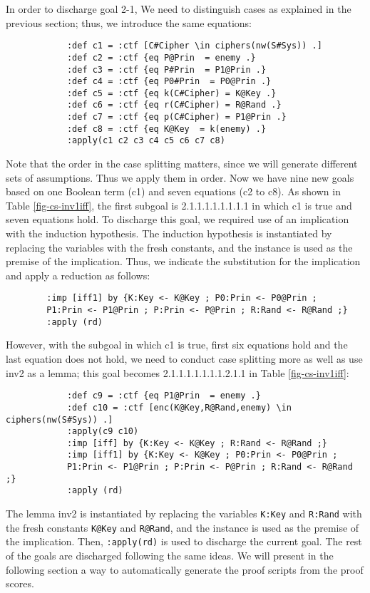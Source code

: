 \documentclass[a4paper,fleqn]{cas-dc}
\begin{document}
In order to discharge goal 2-1, We need to distinguish cases as explained in the previous section; thus, we introduce the same
equations:
	\begin{small}
		\begin{verbatim}
			:def c1 = :ctf [C#Cipher \in ciphers(nw(S#Sys)) .]
			:def c2 = :ctf {eq P@Prin  = enemy .}
			:def c3 = :ctf {eq P#Prin  = P1@Prin .}
			:def c4 = :ctf {eq P0#Prin  = P0@Prin .}
			:def c5 = :ctf {eq k(C#Cipher) = K@Key .}
			:def c6 = :ctf {eq r(C#Cipher) = R@Rand .}
			:def c7 = :ctf {eq p(C#Cipher) = P1@Prin .}
			:def c8 = :ctf {eq K@Key  = k(enemy) .}
			:apply(c1 c2 c3 c4 c5 c6 c7 c8)
		\end{verbatim}
	\end{small}
	\noindent
Note that the order in the case splitting matters, since we will generate different sets of assumptions. Thus we apply them in order. Now we have nine new goals based on one Boolean term (c1) and seven equations (c2 to c8). As shown in Table \ref{fig-cs-inv1iff}, the first subgoal is 2.1.1.1.1.1.1.1.1 in which c1 is true and seven equations hold. To discharge this goal, we required use of an implication with the induction hypothesis. The induction hypothesis is instantiated by	replacing the variables with the fresh constants, and the instance is used as the premise of the implication. Thus, we indicate the substitution for the implication and apply a reduction as follows:
\begin{small}
	\begin{verbatim}
		:imp [iff1] by {K:Key <- K@Key ; P0:Prin <- P0@Prin ;
		P1:Prin <- P1@Prin ; P:Prin <- P@Prin ; R:Rand <- R@Rand ;}
		:apply (rd)
		\end{verbatim}
	\end{small}
	
However, with the subgoal in which c1 is true, first six equations hold and the last equation does not hold, we need to conduct case splitting more as well as use inv2 as a lemma; this goal becomes 2.1.1.1.1.1.1.1.2.1.1 in Table \ref{fig-cs-inv1iff}:
	
	\begin{small}
		\begin{verbatim}
			:def c9 = :ctf {eq P1@Prin  = enemy .}
			:def c10 = :ctf [enc(K@Key,R@Rand,enemy) \in ciphers(nw(S#Sys)) .]
			:apply(c9 c10)
			:imp [iff] by {K:Key <- K@Key ; R:Rand <- R@Rand ;}
			:imp [iff1] by {K:Key <- K@Key ; P0:Prin <- P0@Prin ;
			P1:Prin <- P1@Prin ; P:Prin <- P@Prin ; R:Rand <- R@Rand ;}
			:apply (rd)
		\end{verbatim}
	\end{small}
	\noindent
The lemma inv2 is instantiated by replacing the variables
\verb!K:Key! and \verb!R:Rand! with the fresh constants \verb!K@Key! and \verb!R@Rand!, and the instance is used as the premise of the implication. Then, \verb!:apply(rd)! is
used to discharge the current goal.
The rest of the goals are discharged following the same ideas. 
We will present in the following section a way to automatically generate the proof scripts from the proof scores.	
\end{document}
